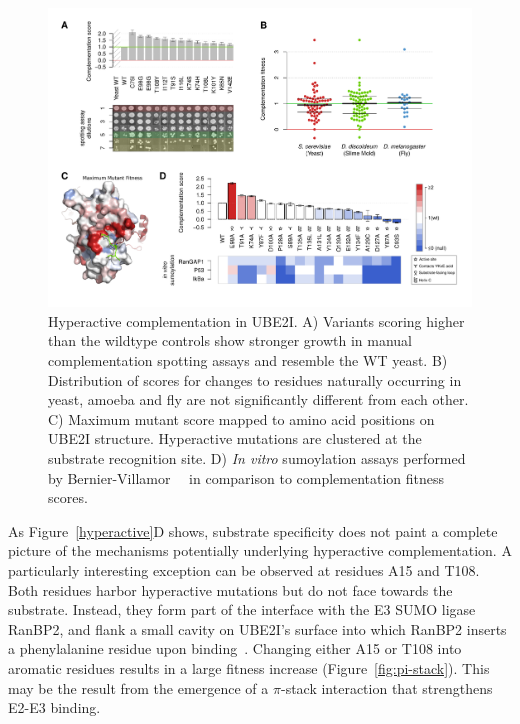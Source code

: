 \begin{figure}[h!]
	\centering
	\includegraphics[width=\textwidth]{img/hyperactive.pdf}
	\caption{Hyperactive complementation in UBE2I. A) Variants scoring higher than the wildtype controls show stronger growth in manual complementation spotting assays and resemble the WT yeast. B) Distribution of scores for changes to residues naturally occurring in yeast, amoeba and fly are not significantly different from each other. C) Maximum mutant score mapped to amino acid positions on UBE2I structure. Hyperactive mutations are clustered at the substrate recognition site. D) \textit{In vitro} sumoylation assays performed by Bernier-Villamor~\etal~\cite{bernier-villamor_structural_2002} in comparison to complementation fitness scores.}
	\label{fig:hyperactive}
\end{figure}


As Figure~\ref{hyperactive}D shows, substrate specificity does not paint a complete picture of the mechanisms potentially underlying hyperactive complementation. A particularly interesting exception can be observed at residues A15 and T108. Both residues harbor hyperactive mutations but do not face towards the substrate. Instead, they form part of the interface with the E3 SUMO ligase RanBP2, and flank a small cavity on UBE2I's surface into which RanBP2 inserts a phenylalanine residue upon binding~\cite{gareau_determinants_2012}. Changing either A15 or T108 into aromatic residues results in a large fitness increase (Figure~\ref{fig:pi-stack}). This may be the result from the emergence of a $\pi$-stack interaction that strengthens E2-E3 binding.

